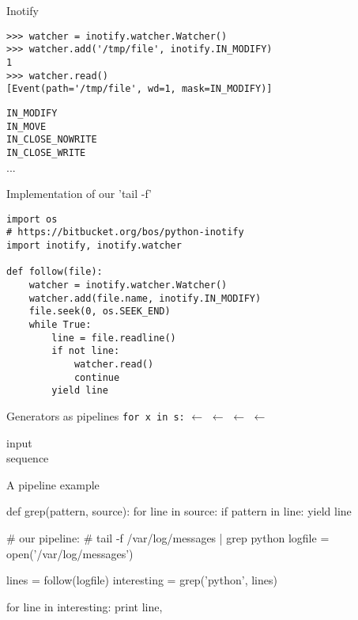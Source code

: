 \documentclass{beamer}
\newcommand{\lla}{\ensuremath{\longleftarrow}}
\begin{document}

\begin{frame}[fragile]{Inotify}
  \begin{verbatim}
>>> watcher = inotify.watcher.Watcher()
>>> watcher.add('/tmp/file', inotify.IN_MODIFY)
1
>>> watcher.read()
[Event(path='/tmp/file', wd=1, mask=IN_MODIFY)]
  \end{verbatim}

  \pause
  \texttt{IN\_MODIFY}\\
  \texttt{IN\_MOVE}\\
  \texttt{IN\_CLOSE\_NOWRITE}\\
  \texttt{IN\_CLOSE\_WRITE}\\
  ...
\end{frame}

\begin{frame}[fragile]{Implementation of our 'tail -f'}
\begin{verbatim}
import os
# https://bitbucket.org/bos/python-inotify
import inotify, inotify.watcher

def follow(file):
    watcher = inotify.watcher.Watcher()
    watcher.add(file.name, inotify.IN_MODIFY)
    file.seek(0, os.SEEK_END)
    while True:
        line = file.readline()
        if not line:
            watcher.read()
            continue
        yield line
\end{verbatim}
\end{frame}

\begin{frame}{Generators as pipelines}
  \mbox{\alert<6>{\texttt{for x in s:}}}%
  \lla {}%
  \lla {}%
  \lla {}%
  \lla \parbox{4.5em}{\alert<2>{input\\sequence}}
\end{frame}

\begin{frame}[fragile]{A pipeline example}
  \begin{pycode}
    def grep(pattern, source):
        for line in source:
            if pattern in line:
                 yield line
  \end{pycode}
  \pause

  \begin{pycode}
    # our pipeline:
    #     tail -f /var/log/messages | grep python
    logfile = open('/var/log/messages')

    lines = follow(logfile)
    interesting = grep('python', lines)

    for line in interesting:
        print line,
  \end{pycode}
\end{frame}
\end{document}

